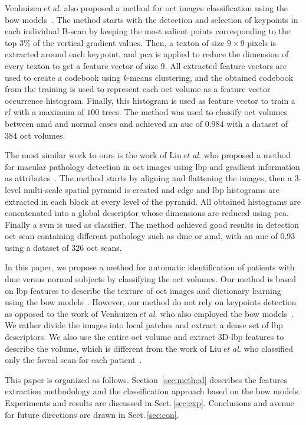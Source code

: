 Venhuizen\,\textit{et al.} also proposed a method for \ac{oct} images classification using the \ac{bow} models~\cite{Venhuizen2015}.
The method starts with the detection and selection of keypoints in each individual B-scan by keeping the most salient points corresponding to the top $3 \%$ of the vertical gradient values. Then, a texton of size $9 \times 9$ pixels is extracted around each keypoint, and \ac{pca} is applied to reduce the dimension of every texton to get a feature vector of size $9$. 
All extracted feature vectors are used to create a codebook using \textit{k}-means clustering, and the obtained codebook from the training is used to represent each \ac{oct} volume as a feature vector occurrence histogram. 
Finally, this histogram is used as feature vector to train a \ac{rf} with a maximum of $100$ trees.
The method was used to classify \ac{oct} volumes between \ac{amd} and normal cases and achieved an \ac{auc} of $0.984$ with a dataset of $384$ \ac{oct} volumes. 

The most similar work to ours is the work of Liu\,\textit{et al.} who proposed a method for macular pathology detection in \ac{oct} images using \ac{lbp} and gradient information as attributes~\cite{Liu2011}.
The method starts by aligning and flattening the images, then a $3$-level multi-scale spatial pyramid is created and edge and \ac{lbp} histograms are extracted in each block at every level of the pyramid. 
All obtained histograms are concatenated into a global descriptor whose dimensions are reduced using \ac{pca}. Finally a \ac{svm} is used as classifier. 
The method achieved good results in detection \ac{oct} scan containing different pathology such as \ac{dme} or \ac{amd}, with an \ac{auc} of $0.93$ using a dataset of $326$ \ac{oct} scans.  

In this paper, we propose a method for automatic identification of patients with \ac{dme} versus normal subjects by classifying the \ac{oct} volumes. Our method is based on \ac{lbp} features to describe the texture of \ac{oct} images and dictionary learning using the \ac{bow} models~\cite{Sivic2003}.
However, our method do not rely on keypoints detection as opposed to the work of Venhuizen\,\textit{et al.} who also employed the \ac{bow} models~\cite{Venhuizen2015}. We rather divide the images into local patches and extract a dense set of \ac{lbp} descriptors.
We also use the entire \ac{oct} volume and extract 3D-\ac{lbp} features to describe the volume, which is different from the work of Liu\,\textit{et al.} who classified only the foveal scan for each patient~\cite{Liu2011}.

This paper is organized as follows. Section~\ref{sec:method} describes the features extraction methodology and the classification approach based on the \ac{bow} models. Experiments and results are discussed in Sect.\,\ref{sec:exp}. Conclusions and avenue for future directions are drawn in Sect.\,\ref{sec:con}.


